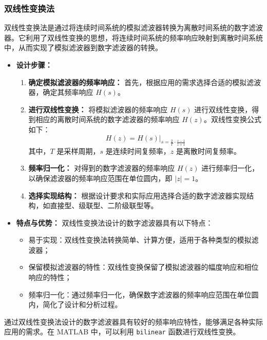 \documentclass[a4paper,12pt]{article}
\begin{document}
\subsubsection{双线性变换法}
双线性变换法是通过将连续时间系统的模拟滤波器转换为离散时间系统的数字滤波器。它利用了双线性变换的思想，将连续时间系统的频率响应映射到离散时间系统中，从而实现了模拟滤波器到数字滤波器的转换。

\begin{itemize}
    \item \textbf{设计步骤：}
        \begin{enumerate}
            \item \textbf{确定模拟滤波器的频率响应：} 首先，根据应用的需求选择合适的模拟滤波器，确定其频率响应 \( H(s) \)。
            
            \item \textbf{进行双线性变换：} 将模拟滤波器的频率响应 \( H(s) \) 进行双线性变换，得到相应的离散时间系统的数字滤波器的频率响应 \( H(z) \)。双线性变换公式如下：
            \[ H(z) = H(s)\bigg|_{s = \frac{2}{T} \cdot \frac{z - 1}{z + 1}} \]
            其中，\( T \) 是采样周期，\( s \) 是连续时间复频率，\( z \) 是离散时间复频率。
            
            \item \textbf{频率归一化：} 对得到的数字滤波器的频率响应 \( H(z) \) 进行频率归一化，以确保滤波器的频率响应范围在单位圆内，即 \( |z| = 1 \)。
            
            \item \textbf{选择实现结构：} 根据设计要求和实际应用选择合适的数字滤波器实现结构，如直接型、级联型、二阶级联型等。
        \end{enumerate}
    
    \item \textbf{特点与优势：} 双线性变换法设计的数字滤波器具有以下特点：
        \begin{itemize}
            \item 易于实现：双线性变换法转换简单、计算方便，适用于各种类型的模拟滤波器；
            \item 保留模拟滤波器的特性：双线性变换保留了模拟滤波器的幅度响应和相位响应的特性；
            \item 频率归一化：通过频率归一化，确保数字滤波器的频率响应范围在单位圆内，简化了设计和分析过程。
        \end{itemize}
\end{itemize}

通过双线性变换法设计的数字滤波器具有较好的频率响应特性，能够满足各种实际应用的需求。在 MATLAB 中，可以利用 \texttt{bilinear} 函数进行双线性变换。
\end{document}
